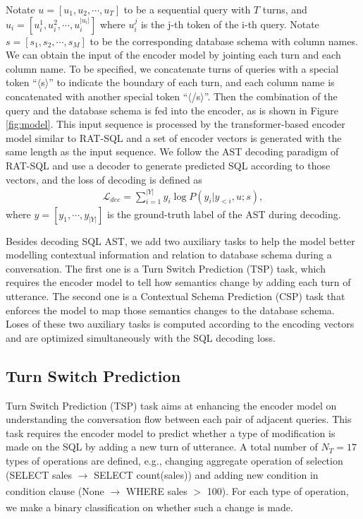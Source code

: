 \documentclass[a4paper]{article}
\begin{document}
Notate $u = [u_1, u_2, \cdots, u_T]$ to be a sequential query with $T$ turns, and $u_i=[u_i^1, u_i^2, \cdots, u_i^{|u_i|}]$ where $u_i^j$ is the j-th token of the i-th query. Notate $s=[s_1, s_2, \cdots, s_M]$ to be the corresponding database schema with column names. We can obtain the input of the encoder model by jointing each turn and each column name. To be specified, we concatenate turns of queries with a special token ``$\langle$s$\rangle$'' to indicate the boundary of each turn, and each column name is concatenated with another special token ``$\langle$/s$\rangle$''. Then the combination of the query and the database schema is fed into the encoder, as is shown in Figure \ref{fig:model}. This input sequence is processed by the transformer-based encoder model similar to RAT-SQL and a set of encoder vectors is generated with the same length as the input sequence. We follow the AST decoding paradigm of RAT-SQL and use a decoder to generate predicted SQL according to those vectors, and the loss of decoding is defined as
\begin{equation}
    \begin{aligned}
    \mathcal{L}_{dec} = \sum_{i=1}^{|Y|} y_i \log P(y_i | y_{<i}, u; s),
    \end{aligned}
\end{equation} where $y=[y_1, \cdots, y_{|Y|}]$ is the ground-truth label of the AST during decoding.

Besides decoding SQL AST, we add two auxiliary tasks to help the model better modelling contextual information and relation to database schema during a conversation. The first one is a Turn Switch Prediction (TSP) task, which requires the encoder model to tell how semantics change by adding each turn of utterance. The second one is a Contextual Schema Prediction (CSP) task that enforces the model to map those semantics changes to the database schema. Loses of these two auxiliary tasks is computed according to the encoding vectors and are optimized simultaneously with the SQL decoding loss.


\subsection{Turn Switch Prediction}

Turn Switch Prediction (TSP) task aims at enhancing the encoder model on understanding the conversation flow between each pair of adjacent queries. This task requires the encoder model to predict whether a type of modification is made on the SQL by adding a new turn of utterance. A total number of $N_T=17$ types of operations are defined, e.g., changing aggregate operation of selection (SELECT sales $\xrightarrow[]{}$ SELECT count(sales)) and adding new condition in condition clause (None $\xrightarrow[]{}$ WHERE sales $>$ 100). For each type of operation, we make a binary classification on whether such a change is made.
\end{document}
